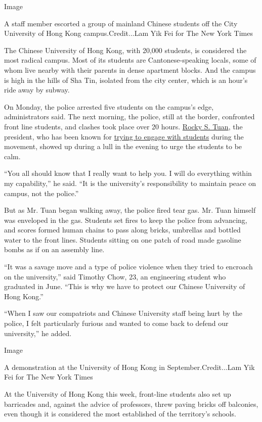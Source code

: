 Image

A staff member escorted a group of mainland Chinese students off the
City University of Hong Kong campus.Credit...Lam Yik Fei for The New
York Times

The Chinese University of Hong Kong, with 20,000 students, is considered
the most radical campus. Most of its students are Cantonese-speaking
locals, some of whom live nearby with their parents in dense apartment
blocks. And the campus is high in the hills of Sha Tin, isolated from
the city center, which is an hour's ride away by subway.

On Monday, the police arrested five students on the campus's edge,
administrators said. The next morning, the police, still at the border,
confronted front line students, and clashes took place over 20 hours.
\href{http://www.cuhk.edu.hk/governance/officers/rocky-tuan/english/biography.html}{Rocky
S. Tuan}, the president, who has been known for
\href{https://www.hongkongfp.com/2019/10/11/i-not-one-hong-kong-student-removes-mask-accuses-police-sexual-assault/}{trying
to engage with students} during the movement, showed up during a lull in
the evening to urge the students to be calm.

``You all should know that I really want to help you. I will do
everything within my capability,'' he said. ``It is the university's
responsibility to maintain peace on campus, not the police.''

But as Mr. Tuan began walking away, the police fired tear gas. Mr. Tuan
himself was enveloped in the gas. Students set fires to keep the police
from advancing, and scores formed human chains to pass along bricks,
umbrellas and bottled water to the front lines. Students sitting on one
patch of road made gasoline bombs as if on an assembly line.

``It was a savage move and a type of police violence when they tried to
encroach on the university,'' said Timothy Chow, 23, an engineering
student who graduated in June. ``This is why we have to protect our
Chinese University of Hong Kong.''

``When I saw our compatriots and Chinese University staff being hurt by
the police, I felt particularly furious and wanted to come back to
defend our university,'' he added.

Image

A demonstration at the University of Hong Kong in September.Credit...Lam
Yik Fei for The New York Times

At the University of Hong Kong this week, front-line students also set
up barricades and, against the advice of professors, threw paving bricks
off balconies, even though it is considered the most established of the
territory's schools.

